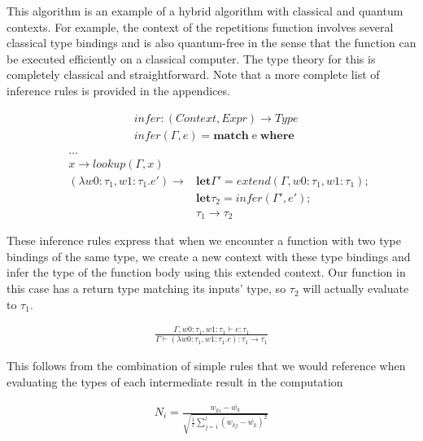 \documentclass{article}
\begin{document}
This algorithm is an example of a hybrid algorithm with classical and quantum contexts. For example, the context of the repetitions function involves several classical type bindings and is also quantum-free in the sense that the function can be executed efficiently on a classical computer. The type theory for this is completely classical and straightforward. Note that a more complete list of inference rules is provided in the appendices.

\begin{align*}
    &infer : (Context, Expr) \rightarrow Type \\
    &infer(\Gamma, e) = \textbf{match} \; \text{e} \;  \textbf{where} \\
\end{align*}
\vspace{-10mm}
\begin{align*}
    &\dots \\
    \;\; &x \rightarrow lookup(\Gamma, x) \\
    \;\; &(\lambda w0:\tau_1, w1:\tau_1.e') \rightarrow &\textbf{let} \Gamma' = extend(\Gamma, w0: \tau_1, w1: \tau_1); \\
    &&\textbf{let} \tau_2 = infer(\Gamma', e'); \\
    && \tau_1 \rightarrow \tau_2
\end{align*}

\vspace{5mm}

These inference rules express that when we encounter a function with two type bindings of the same type, we create a new context with these type bindings and infer the type of the function body using this extended context. Our function in this case has a return type matching its inputs' type, so $\tau_2$ will actually evaluate to $\tau_1$.

\begin{align*}
    \frac{\Gamma, w0: \tau_1, w1: \tau_1 \vdash e: \tau_1}{\Gamma  \vdash (\lambda w0: \tau_1, w1: \tau_1.e): \tau_1 \rightarrow \tau_1}
\end{align*}

\vspace{5mm}

This follows from the combination of simple rules that we would reference when evaluating the types of each intermediate result in the computation

\begin{align*}
    N_i = \frac{w_{ki} - \bar{w_k}}{\sqrt{\frac{1}{l} \sum_{j=1}^l (w_{kj} - \bar{w_k})^2}}
\end{align*}
\end{document}
